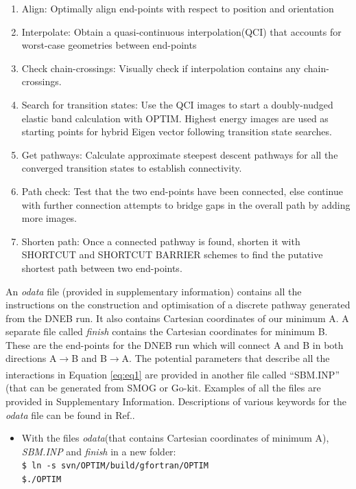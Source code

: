 \documentclass[journal=jacsat]{achemso}
\begin{document}
\begin{enumerate}
    \item { Align: Optimally align end-points with respect to position and orientation}
    \item {Interpolate: Obtain a quasi-continuous interpolation\cite{QCI1,QCI2}(QCI) that accounts for worst-case geometries between end-points}
    \item{Check chain-crossings: Visually check if interpolation contains any chain-crossings.}
    \item{Search for transition states: Use the QCI images to start a doubly-nudged elastic band calculation with OPTIM\cite{OPTIM}. Highest energy images are used as starting points for hybrid Eigen vector following\cite{HEVF1,HEVF2} transition state searches.}
    \item{Get pathways: Calculate approximate steepest descent pathways for all the converged transition states to establish connectivity.}
    \item{Path check: Test that the two end-points have been connected, else continue with further connection attempts to bridge gaps in the overall path by adding more images.}
    \item{Shorten path: Once a connected pathway is found, shorten it with SHORTCUT\cite{Carr05a} and SHORTCUT BARRIER \cite{Strodel07a} schemes to find the putative shortest path between two end-points.}
\end{enumerate}

An \emph{odata} file (provided in supplementary information) contains all the instructions on the construction and optimisation of a discrete pathway generated from the DNEB run. It also contains Cartesian coordinates of our minimum A. A separate file called \emph{finish} contains the Cartesian coordinates for minimum B. These are the end-points for the DNEB run which will connect A and B in both directions A$\xrightarrow[]{}$B and B$\xrightarrow[]{}$A. The potential parameters that describe all the interactions in Equation \ref{eq:eq1} are provided in another file called ``SBM.INP'' (that can be generated from SMOG\cite{smog} or Go-kit\cite{Neelamraju19a}. Examples of all the files are provided in Supplementary Information. Descriptions of various keywords for the \emph{odata} file can be found in Ref.\cite{OPTIM}. 

\begin{itemize}
\small
\item{With the files \emph{odata}(that contains Cartesian coordinates of minimum A), \emph{SBM.INP} and \emph{finish} in a new  folder: \\ \tt{\$ ln -s svn/OPTIM/build/gfortran/OPTIM} \\ \tt{\$./OPTIM}}

\end{itemize}
\end{document}
